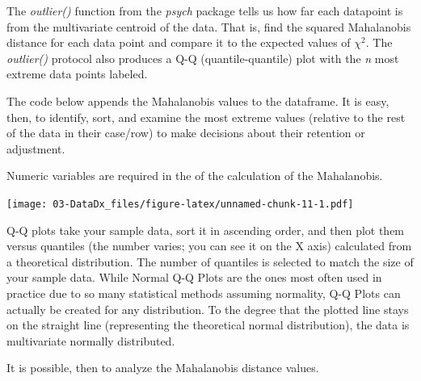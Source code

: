 \documentclass[
  11pt,
]{book}
\newenvironment{Shaded}{\begin{snugshade}}{\end{snugshade}}
\newcommand{\FunctionTok}[1]{\textcolor[rgb]{0.27,0.27,0.27}{\textbf{#1}}}
\newcommand{\NormalTok}[1]{#1}
\newcommand{\OtherTok}[1]{\textcolor[rgb]{0.37,0.37,0.37}{#1}}
\newcommand{\SpecialCharTok}[1]{\textcolor[rgb]{0.43,0.43,0.43}{\textbf{#1}}}
\newcommand{\StringTok}[1]{\textcolor[rgb]{0.5,0.5,0.5}{#1}}
\begin{document}
The \emph{outlier()} function from the \emph{psych} package tells us how far each datapoint is from the multivariate centroid of the data. That is, find the squared Mahalanobis distance for each data point and compare it to the expected values of \(\chi^2\). The \emph{outlier()} protocol also produces a Q-Q (quantile-quantile) plot with the \emph{n} most extreme data points labeled.

The code below appends the Mahalanobis values to the dataframe. It is easy, then, to identify, sort, and examine the most extreme values (relative to the rest of the data in their case/row) to make decisions about their retention or adjustment.

Numeric variables are required in the of the calculation of the Mahalanobis.

\begin{Shaded}
\end{Shaded}

\texttt{[image: 03-DataDx\_files/figure-latex/unnamed-chunk-11-1.pdf]}

Q-Q plots take your sample data, sort it in ascending order, and then plot them versus quantiles (the number varies; you can see it on the X axis) calculated from a theoretical distribution. The number of quantiles is selected to match the size of your sample data. While Normal Q-Q Plots are the ones most often used in practice due to so many statistical methods assuming normality, Q-Q Plots can actually be created for any distribution. To the degree that the plotted line stays on the straight line (representing the theoretical normal distribution), the data is multivariate normally distributed.

It is possible, then to analyze the Mahalanobis distance values.

\begin{Shaded}
\end{Shaded}
\end{document}
